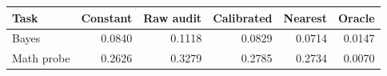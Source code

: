 \begin{tabular}{lrrrrr}
\toprule
Task & Constant & Raw audit & Calibrated & Nearest & Oracle\\
\midrule
Bayes & 0.0840 & 0.1118 & 0.0829 & 0.0714 & 0.0147\\
Math probe & 0.2626 & 0.3279 & 0.2785 & 0.2734 & 0.0070\\
\bottomrule
\end{tabular}
